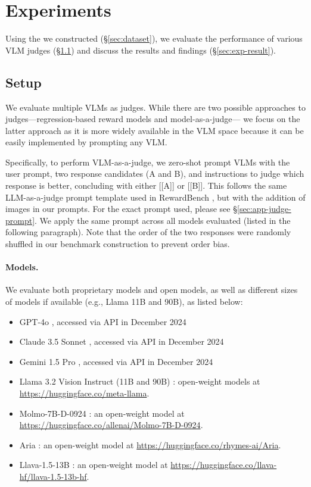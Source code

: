 \section{Experiments}
\label{sec:exp}

Using the \methodname we constructed (\S \ref{sec:dataset}), we evaluate the performance of various VLM judges (\S \ref{sec:exp-setup}) and discuss the results and findings (\S \ref{sec:exp-result}).


\subsection{Setup}
\label{sec:exp-setup}
We evaluate multiple VLMs as judges. While there are two possible approaches to judges---regression-based reward models and model-as-a-judge--- 
we focus on the latter approach as it is more widely available in the VLM space because it can be easily implemented by prompting any VLM.

Specifically, to perform VLM-as-a-judge, we zero-shot prompt VLMs with the user prompt, two response candidates (A and B), and instructions to judge which response is better, concluding with either [[A]] or [[B]]. This follows the same LLM-as-a-judge prompt template used in RewardBench \citep{lambert2024rewardbench}, but with the addition of images in our prompts. For the exact prompt used, please see \S \ref{sec:app-judge-prompt}. We apply the same prompt across all models evaluated (listed in the following paragraph).
Note that the order of the two responses were randomly shuffled in our benchmark construction to prevent order bias.  




\paragraph{Models.} 
We evaluate both proprietary models and open models, as well as different sizes of models if available (e.g., Llama 11B and 90B), as listed below:
\begin{itemize}
\setlength{\leftskip}{-0mm}
\setlength{\itemsep}{-0mm}
    \item GPT-4o \citep{gpt4o}, accessed via API in December 2024
    \item Claude 3.5 Sonnet \citep{claude3.5}, accessed via API in December 2024
    \item Gemini 1.5 Pro \citep{team2024gemini}, accessed via API in December 2024
    \item Llama 3.2 Vision Instruct (11B and 90B) \citep{llama3}: open-weight models at \url{https://huggingface.co/meta-llama}.
    \item Molmo-7B-D-0924 \citep{deitke2024molmo}: an open-weight model at\\ \url{https://huggingface.co/allenai/Molmo-7B-D-0924}.
    \item Aria \citep{aria}: an open-weight model at \url{https://huggingface.co/rhymes-ai/Aria}.
    \item Llava-1.5-13B \citep{liu2024improved}: an open-weight model at \url{https://huggingface.co/llava-hf/llava-1.5-13b-hf}.
\end{itemize}



